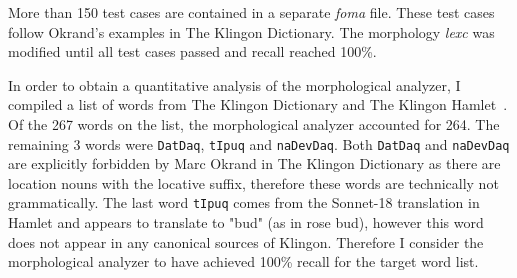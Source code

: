 \documentclass[11pt]{article}
\begin{document}
More than 150 test cases are contained in a separate \textit{foma} file. These test cases follow Okrand's examples in The Klingon Dictionary. The morphology \textit{lexc} was modified until all test cases passed and recall reached 100\%.

In order to obtain a quantitative analysis of the morphological analyzer, I compiled a list of words from The Klingon Dictionary and The Klingon Hamlet~\cite{0964434512}. Of the 267 words on the list, the morphological analyzer accounted for 264. The remaining 3 words were \texttt{DatDaq}, \texttt{tIpuq} and \texttt{naDevDaq}. Both \texttt{DatDaq} and \texttt{naDevDaq} are explicitly forbidden by Marc Okrand in The Klingon Dictionary as there are location nouns with the locative suffix, therefore these words are technically not grammatically. The last word \texttt{tIpuq} comes from the Sonnet-18 translation in Hamlet and appears to translate to "bud" (as in rose bud), however this word does not appear in any canonical sources of Klingon. Therefore I consider the morphological analyzer to have achieved 100\% recall for the target word list.

%
%



\end{document}
